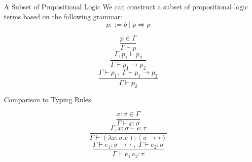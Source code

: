 \documentclass[
	aspectratio=169, %
	8pt, %
]{beamer}
\begin{document}
\begin{frame}{\insertsubsection}
		\begin{definition}{A Subset of Propositional Logic}
			We can construct a subset of propositional logic terms based on the following grammar:
			\begin{equation} 
							p ::= b \; | \;p \Rightarrow p
			\end{equation}
						\begin{fancycolumns}[columns=3,animation=none]
										\begin{equation}
												\frac{p \in \Gamma}{\Gamma \vdash p}
										\end{equation}
										\nextcolumn
										\begin{equation}
												\frac{\Gamma, p_1 \vdash p_2}{\Gamma \vdash p_1 \rightarrow p_2}
										\end{equation}
										\nextcolumn
										\begin{equation}
												\frac{\Gamma \vdash p_1, \; \Gamma \vdash p_1 \rightarrow p_2}{\Gamma \vdash p_2}
										\end{equation}
						\end{fancycolumns}
		\end{definition}

		\pause 

		\begin{note}{Comparison to Typing Rules}
						\begin{fancycolumns}[columns=3,animation=none]
										\begin{equation*}
												\frac{x:\sigma \in \Gamma}{\Gamma \vdash x:\sigma}
										\end{equation*}
										\nextcolumn
										\begin{equation*}
												\frac{\Gamma, x:\sigma \vdash e:\tau}{\Gamma \vdash (\lambda x: \sigma . e) : (\sigma \rightarrow \tau)}
										\end{equation*}
										\nextcolumn
										\begin{equation*}
												\frac{\Gamma \vdash e_1: \sigma \rightarrow \tau \;,\; \Gamma \vdash e_2:\sigma}{\Gamma \vdash e_1 \, e_2 : \tau}
										\end{equation*}
						\end{fancycolumns}
		\end{note}
\end{frame}
\end{document}
